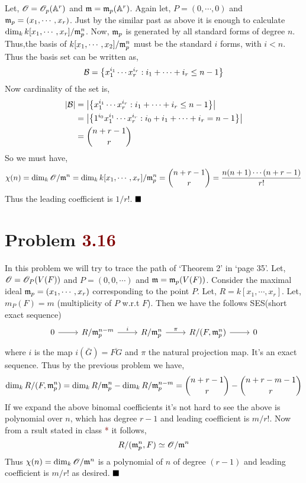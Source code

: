 \documentclass[12pt]{article}
\begin{document}
\vspace*{0.2cm}


\noindent {} Let, $\mathscr{O} = \mathscr{O}_p(\mathbb{A}^r)$ and $\mathfrak{m} = \mathfrak{m}_p(\mathbb{A}^r)$. Again let, $P=(0,\cdots,0)$ and $\mathfrak{m}_p =(x_1,\cdots,x_r)$. Just by the similar past as above it is enough to calculate $\dim_k k[x_1,\cdots,x_r]/\mathfrak{m}_p^n$. Now, $\mathfrak{m}_p$ is generated by all standard forms of degree $n$. Thus,the basis of $k[x_1,\cdots,x_2]/\mathfrak{m}_p^n$ must be the standard $i$ forms, with $i<n$. Thus the basis set can be written as, 
$$\mathcal{B} = \qty{x_1^{i_1}\cdots x_r^{i_r}:i_1+\cdots +i_r \leq n-1}$$ Now cardinality of the set is, \begin{align*}
    \abs{\mathcal{B}} &= \abs{\qty{x_1^{i_1}\cdots x_r^{i_r}:i_1+\cdots +i_r \leq n-1}} \\
    &= \abs{\qty{1^{i_0}x_1^{i_1}\cdots x_r^{i_r}:i_0+i_1+\cdots +i_r =n-1}} \\
    &= \binom{n+r-1}{r}
\end{align*}
So we must have,  $$\chi(n) = \dim_k \mathscr{O}/\mathfrak{m}^n= \dim_k k[x_1,\cdots,x_r]/\mathfrak{m}_p^n = \binom{n+r-1}{r}= \frac{n(n+1)\cdots (n+r-1)}{r!}$$ Thus the leading coefficient is $1/r!$. $\hfill \blacksquare$

\section{Problem \textcolor{maroon}{3.16}} %

In this problem we will try to trace the path of `Theorem 2' in `page 35'. Let, $\mathscr{O} = \mathscr{O}_P(V(F))$ and $P=(0,0,\cdots)$ and $\mathfrak{m} = \mathfrak{m}_p(V(F))$. Consider the maximal ideal $\mathfrak{m}_p=(x_1,\cdots,x_r)$ corresponding to the point $P$. Let, $R = k[x_1,\cdots,x_r]$. Let, $m_P(F)=m$ (multiplicity of $P$ w.r.t $F$). Then we have the follows SES(short exact sequence) \[\begin{tikzcd}
    0 & {R/\m_p^{n-m}} & {R/\m_p^n} & {R/(F,\m_p^n)} & 0
    \arrow[from=1-1, to=1-2]
    \arrow["i", from=1-2, to=1-3]
    \arrow["\pi", from=1-3, to=1-4]
    \arrow[from=1-4, to=1-5]
    \end{tikzcd}\]
where $i$ is the map $i(\bar{G})=\overline{FG}$ and $\pi$ the natural projection map. It's an exact sequence. Thus by the previous problem we have, $$\dim_k R/(F,\mathfrak{m}_p^n) = \dim_k R/\mathfrak{m}_p^n - \dim_k R/\mathfrak{m}_p^{n-m}= \binom{n+r-1}{r}-\binom{n+r-m-1}{r}$$ If we expand the above binomal coefficients it's not hard to see the above is polynomial over $n$, which has degree $r-1$ and leading coefficient is $m/r!$. Now from a rsult stated in class \textcolor{maroon}{*} it follows, $$R/(\mathfrak{m}_p^n,F) \simeq \mathscr{O}/\mathfrak{m}^n$$ Thus $\chi(n) = \dim_k \mathscr{O}/\mathfrak{m}^n$ is a polynomial of $n$ of degree $(r-1)$ and leading coefficient is $m/r!$ as desired. $\hfill \blacksquare$
\end{document}
